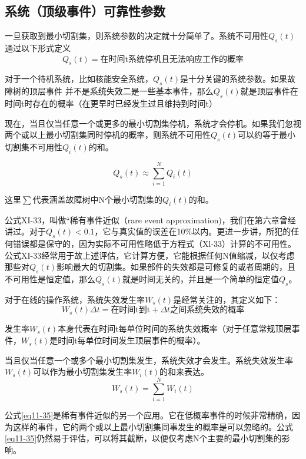 \documentclass[cn,11pt,chinese]{elegantbook}
\begin{document}
{\subsection{系统（顶级事件）可靠性参数}

一旦获取到最小切割集，则系统参数的决定就十分简单了。系统不可用性$Q_s(t)$通过以下形式定义
\begin{equation}\label{eq11-32}
	Q_s(t)=\mbox{在时间t系统停机且无法响应工作的概率}
\end{equation}


对于一个待机系统，比如核能安全系统，$Q_s(t)$是十分关键的系统参数。如果故障树的顶层事件
并不是系统失效二是一些基本事件，那么$Q_s(t)$就是顶层事件在时间t时存在的概率（在更早时已经发生过且维持到时间t）

现在，当且仅当任意一个或更多的最小切割集停机，系统才会停机。如果我们忽视两个或以上最小切割集同时停机的概率，则系统不可用性$Q_s(t)$可以约等于最小切割集不可用性$Q_i(t)$的和。

\begin{equation}\label{eq11-33}
Q_s(t) \approx \sum_{i=1}^{N}Q_i(t) 
\end{equation}


这里$\sum$代表涵盖故障树中N个最小切割集的$Q_i(t)$的和。

公式XI-33，叫做“稀有事件近似（rare event approximation)，我们在第六章曾经讲过。对于$Q_s(t)<0.1$，它与真实值的误差在10\%以内。更进一步讲，所犯的任何错误都是保守的，因为实际不可用性略低于方程式（Xl-33）计算的不可用性。公式XI-33经常用于故上述评估，它计算方便，它能根据任何N值缩减，以仅考虑那些对$Q_s(t)$影响最大的切割集。如果部件的失效都是可修复的或者周期的，且不可用性是恒定值，那么$Q_s(t)$就是时间无关的，并且是一个简单的恒定值$Q_s$。

对于在线的操作系统，系统失效发生率$W_s(t)$是经常关注的，其定义如下：
\begin{equation}\label{eq11-34}
W_s(t) \Delta t = \mbox{在时间t到t}+\Delta t\mbox{之间系统失效的概率} 
\end{equation}

发生率$W_s(t)$本身代表在时间t每单位时间的系统失效概率（对于任意常规顶层事件，$W_s(t)$是时间t每单位时间发生顶层事件的概率）。

当且仅当任意一个或多个最小切割集发生，系统失效才会发生。系统失效发生率$W_s(t)$可以作为最小切割集发生率$W_i(t)$的和来表达。
\begin{equation}\label{eq11-35}
W_s(t) = \sum_{i=1}^{N}W_i(t) 
\end{equation}


公式\ref{eq11-35}是稀有事件近似的另一个应用。它在低概率事件的时候非常精确，因为这样的事件，它的两个或以上最小切割集同事发生的概率是可以忽略的。公式\ref{eq11-35}仍然易于评估，可以将其截断，以便仅考虑N个主要的最小切割集的影响。

}
\end{document}
